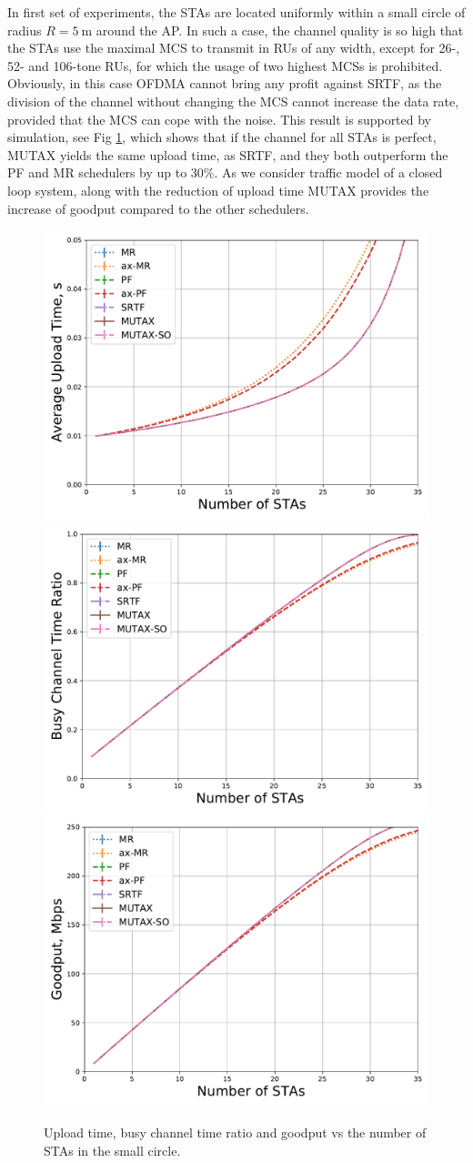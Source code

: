 In first set of experiments, the STAs are located uniformly within a small circle of radius $R = \SI{5}{\m}$ around the AP.
In such a case, the channel quality is so high that the STAs use the maximal MCS to transmit in RUs of any width, except for 26-, 52- and 106-tone RUs, for which the usage of two highest MCSs is prohibited. Obviously, in this case OFDMA cannot bring any profit against SRTF, as the division of the channel without changing the MCS cannot increase the data rate, provided that the MCS can cope with the noise.
This result is supported by simulation, see Fig \ref{fig:10-e}, which shows that if the channel for all STAs is perfect, MUTAX yields the same upload time, as SRTF, and they both outperform the PF and MR schedulers by up to 30\%. 
As we consider traffic model of a closed loop system, along with the reduction of upload time MUTAX provides the increase of goodput compared to the other schedulers.

\begin{figure}[tb]
	\centering
	\includegraphics[width = 0.32\linewidth]{5-d.pdf}
	\includegraphics[width = 0.32\linewidth]{5-e.pdf}
	\includegraphics[width = 0.32\linewidth]{5-t.pdf}
	\caption{\label{fig:10-e}  Upload time, busy channel time ratio and goodput vs the number of STAs in the small circle.}
\end{figure}

